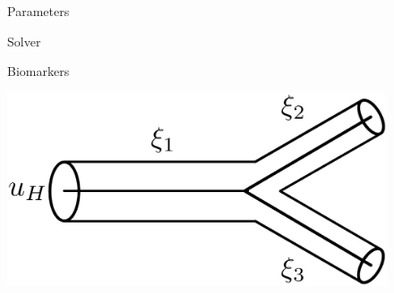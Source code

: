 \documentclass[compress]{beamer}
\begin{document}
\begin{frame}
\begin{figure}[htbp]
{\begin{minipage}[c][0.35\paperheight][c]{\linewidth}
\begin{minipage}{0.1\linewidth}
			\end{minipage}
	\end{minipage}}
		\vfill
		\begin{minipage}[t][0.06\paperheight][t]{\linewidth}
			\begin{minipage}{0.18\linewidth}
				\caption*{\tiny Parameters}
			\end{minipage}
			\hfill
			\begin{minipage}{0.1\linewidth}
				\caption*{\tiny}
			\end{minipage}
			\hfill
			\begin{minipage}{0.18\linewidth}
				\caption*{\tiny Solver}
			\end{minipage}
			\hfill
			\begin{minipage}{0.1\linewidth}
				\caption*{\tiny}
			\end{minipage}
			\hfill
			\begin{minipage}{0.18\linewidth}
				\caption*{\tiny Biomarkers}
			\end{minipage}
			\hfill
			\begin{minipage}{0.1\linewidth}
				\caption*{\tiny}
			\end{minipage}
		\end{minipage}
		\begin{minipage}[c][0.33\paperheight][c]{\linewidth}
			\begin{minipage}{0.18\linewidth}
				\includegraphics[width=\linewidth]{images/bifurcation.eps}
			\end{minipage}
			\hfill
			\begin{minipage}{0.1\linewidth}

\end{minipage}
\end{minipage}
\end{figure}
\end{frame}
\end{document}
